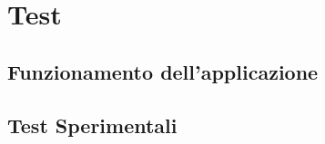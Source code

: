\def \ti{\textit}
\def \bf{\textbf}

\chapter{Test}
	\label{cap:test}
	
\section{Funzionamento dell'applicazione}
	\label{sec:funzionamento}

\section{Test Sperimentali}
	\label{sec:esperimenti}